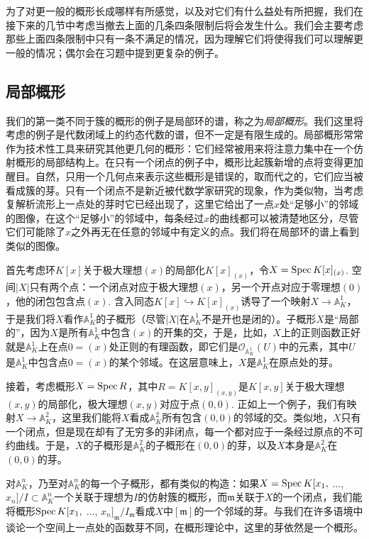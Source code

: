 为了对更一般的概形长成哪样有所感觉，以及对它们有什么益处有所把握，我们在接下来的几节中考虑当撤去上面的几条四条限制后将会发生什么。我们会主要考虑那些上面四条限制中只有一条不满足的情况，因为理解它们将使得我们可以理解更一般的情况；偶尔会在习题中提到更复杂的例子。

\subsection{局部概形}

我们的第一类不同于簇的概形的例子是局部环的谱，称之为\textit{局部概形}。我们这里将考虑的例子是代数闭域上的约态代数的谱，但不一定是有限生成的。局部概形常常作为技术性工具来研究其他更几何的概形：它们经常被用来将注意力集中在一个仿射概形的局部结构上。在只有一个闭点的例子中，概形比起簇新增的点将变得更加醒目。自然，只用一个几何点来表示这些概形是错误的，取而代之的，它们应当被看成簇的芽。只有一个闭点不是新近被代数学家研究的现象，作为类似物，当考虑复解析流形上一点处的芽时它已经出现了，这里它给出了一点$x$处“足够小”的邻域的图像，在这个“足够小”的邻域中，每条经过$x$的曲线都可以被清楚地区分，尽管它们可能除了$x$之外再无在任意的邻域中有定义的点。我们将在局部环的谱上看到类似的图像。

首先考虑环$K[x]$关于极大理想$(x)$的局部化$K[x]_{(x)}$，令$X=\operatorname{Spec} K[x]_{(x)}$. 空间$|X|$只有两个点：一个闭点对应于极大理想$(x)$，另一个开点对应于零理想$(0)$，他的闭包包含点$(x)$. 含入同态$K[x]\hookrightarrow K[x]_{(x)}$诱导了一个映射$X\to \mathbb{A}_K^1$，于是我们将$X$看作$\mathbb{A}_K^1$的子概形（尽管$|X|$在$\mathbb{A}_K^1$不是开也是闭的）。子概形$X$是“局部的”，因为$X$是所有$\mathbb{A}_K^1$中包含$(x)$的开集的交，于是，比如，$X$上的正则函数正好就是$\mathbb{A}_K^1$上在点$0=(x)$处正则的有理函数，即它们是$\mathscr{O}_{\mathbb{A}_K^1}(U)$中的元素，其中$U$是$\mathbb{A}_K^1$中包含点$0=(x)$的某个邻域。在这层意味上，$X$是$\mathbb{A}_K^1$在原点处的芽。

接着，考虑概形$X=\operatorname{Spec} R$，其中$R=K[x,y]_{(x,y)}$是$K[x,y]$关于极大理想$(x,y)$的局部化，极大理想$(x,y)$对应于点$(0,0)$. 正如上一个例子，我们有映射$X\to \mathbb{A}_K^2$，这里我们能将$X$看成$\mathbb{A}_K^2$所有包含$(0,0)$的邻域的交。类似地，$X$只有一个闭点，但是现在却有了无穷多的非闭点，每一个都对应于一条经过原点的不可约曲线。于是，$X$的子概形是$\mathbb{A}_K^2$的子概形在$(0,0)$的芽，以及$X$本身是$\mathbb{A}_K^2$在$(0,0)$的芽。

对$\mathbb{A}_K^n$，乃至对$\mathbb{A}_K^n$的每一个子概形，都有类似的构造：如果$X=\operatorname{Spec} K[x_1,$ $\dots$, $x_n]/I\subset \mathbb{A}_K^n$一个关联于理想为$I$的仿射簇的概形，而$\mathfrak{m}$关联于$X$的一个闭点，我们能将概形$\operatorname{Spec} K[x_1,$ $\dots$, $x_n]_\mathfrak{m}/I_{\mathfrak{m}}$看成$X$中$[\mathfrak{m}]$的一个邻域的芽。与我们在许多语境中谈论一个空间上一点处的函数芽不同，在概形理论中，这里的芽依然是一个概形。\nottran

